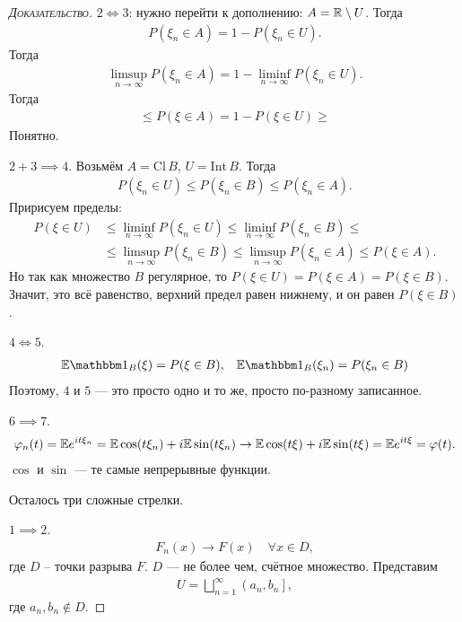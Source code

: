 \documentclass[../main.tex]{subfiles}
\begin{document}
\begin{proof}[\normalfont\textsc{Доказательство}]
 $ 2 \iff 3 $: нужно перейти к дополнению: $ A = \mathbb{R} \setminus U $. Тогда
 \begin{align*}
  P(\xi_n \in A) = 1 - P(\xi_n \in U).
 \end{align*} Тогда
 \begin{align*}
  \limsup_{n \to \infty} P(\xi_n \in A) = 1 - \liminf_{n \to \infty} P(\xi_n \in U).
 \end{align*} Тогда 
 \begin{align*}
  \leqslant P(\xi \in A) = 1 - P(\xi \in U) \geqslant 
 \end{align*} Понятно.

 $ 2 + 3 \implies 4 $. Возьмём $ A = \mathrm{Cl}\,B $, $ U = \mathrm{Int}\,B $. Тогда
 \begin{align*}
  P(\xi_n \in U) \leqslant P(\xi_n \in B) \leqslant P(\xi_n \in A).
 \end{align*} Пририсуем пределы:
 \begin{align*}
  P(\xi \in U) &\leqslant \liminf_{n \to \infty} P(\xi_n \in U) \leqslant \liminf_{n \to \infty} P(\xi_n \in B) \leqslant \\
  &\leqslant \limsup_{n \to \infty} P(\xi_n \in B) \leqslant \limsup_{n \to \infty} P(\xi_n \in A) \leqslant P(\xi \in A).
 \end{align*} Но так как множество $ B $ регулярное, то $ P(\xi \in U) = P(\xi \in A) = P(\xi \in B) $. Значит, это всё равенство, верхний предел равен нижнему, и он равен $ P(\xi \in B) $.

 $ 4 \iff 5 $.
 \begin{align*}
  \E \Ind_B (\xi) = P(\xi \in B), && \E \Ind_B(\xi_n) = P(\xi_n \in B)
 \end{align*} Поэтому, $ 4 $ и $ 5 $ --- это просто одно и то же, просто по-разному записанное.

 $ 6 \implies 7 $.
 \begin{align*}
  \varphi_n(t) = \mathbb E e^{it\xi_n} = \mathbb E \cos(t\xi_n) + i \mathbb E \sin(t\xi_n) \to \mathbb E\cos(t\xi) + i\mathbb E\sin(t\xi) = \mathbb E e^{it\xi} = \varphi(t).
 \end{align*} $ \cos $ и $ \sin $ ---  те самые непрерывные функции.

 Осталось три сложные стрелки.

 $ 1 \implies 2 $.
 \begin{align*}
  F_n(x) \to F(x) \quad \forall x \in D,
 \end{align*} где $ D $ -- точки разрыва $ F $. $ D $ --- не более чем, счётное множество. Представим
 \begin{align*}
  U = \bigsqcup_{n=1}^{\infty} \left(a_n, b_n\right],
 \end{align*} где $ a_n, b_n \notin D $.


\end{proof}
\end{document}
